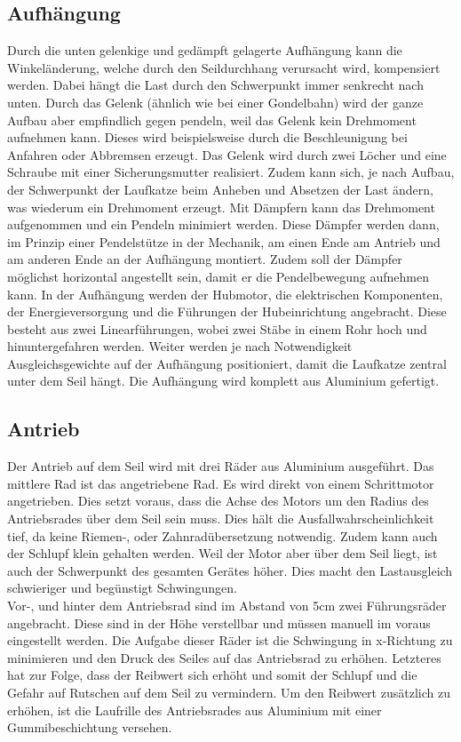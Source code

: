 \documentclass[a4paper]{report}
\begin{document}
\subsection{Aufhängung}
Durch die unten gelenkige und gedämpft gelagerte Aufhängung kann die Winkeländerung, welche durch den Seildurchhang verursacht wird, kompensiert werden. Dabei hängt die Last durch den Schwerpunkt immer senkrecht nach unten. Durch das Gelenk (ähnlich wie bei einer Gondelbahn) wird der ganze Aufbau aber empfindlich gegen pendeln, weil das Gelenk kein Drehmoment aufnehmen kann. Dieses wird beispielsweise durch die Beschleunigung bei Anfahren oder Abbremsen erzeugt. Das Gelenk wird durch zwei Löcher und eine Schraube mit einer Sicherungsmutter realisiert. Zudem kann sich, je nach Aufbau, der Schwerpunkt der Laufkatze beim Anheben und Absetzen der Last ändern, was wiederum ein Drehmoment erzeugt. Mit Dämpfern kann das Drehmoment aufgenommen und ein Pendeln minimiert werden. Diese Dämpfer werden dann, im Prinzip einer Pendelstütze in der Mechanik, am einen Ende am Antrieb und am anderen Ende an der Aufhängung montiert. Zudem soll der Dämpfer möglichst horizontal angestellt sein, damit er die Pendelbewegung aufnehmen kann. In der Aufhängung werden der Hubmotor, die elektrischen Komponenten, der Energieversorgung und die Führungen der Hubeinrichtung angebracht. Diese besteht aus zwei Linearführungen, wobei zwei Stäbe in einem Rohr hoch und hinuntergefahren werden. Weiter werden je nach Notwendigkeit Ausgleichsgewichte auf der Aufhängung positioniert, damit die Laufkatze zentral unter dem Seil hängt. Die Aufhängung wird komplett aus Aluminium gefertigt.

\subsection{Antrieb}
Der Antrieb auf dem Seil wird mit drei Räder aus Aluminium ausgeführt. Das mittlere Rad ist das angetriebene Rad. Es wird direkt von einem Schrittmotor angetrieben. Dies setzt voraus, dass die Achse des Motors um den Radius des Antriebsrades über dem Seil sein muss. Dies hält die Ausfallwahrscheinlichkeit tief, da keine Riemen-, oder Zahnradübersetzung notwendig. Zudem kann auch der Schlupf klein gehalten werden. Weil der Motor aber über dem Seil liegt, ist auch der Schwerpunkt des gesamten Gerätes höher. Dies macht den Lastausgleich schwieriger und begünstigt Schwingungen.\\
Vor-, und hinter dem Antriebsrad sind im Abstand von 5cm zwei Führungsräder angebracht. Diese sind in der Höhe verstellbar und müssen manuell im voraus eingestellt werden. Die Aufgabe dieser Räder ist die Schwingung in x-Richtung zu minimieren und den Druck des Seiles auf das Antriebsrad zu erhöhen. Letzteres hat zur Folge, dass der Reibwert sich erhöht und somit der Schlupf und die Gefahr auf Rutschen auf dem Seil zu vermindern. Um den Reibwert zusätzlich zu erhöhen, ist die Laufrille des Antriebsrades aus Aluminium mit einer Gummibeschichtung versehen.
\end{document}
